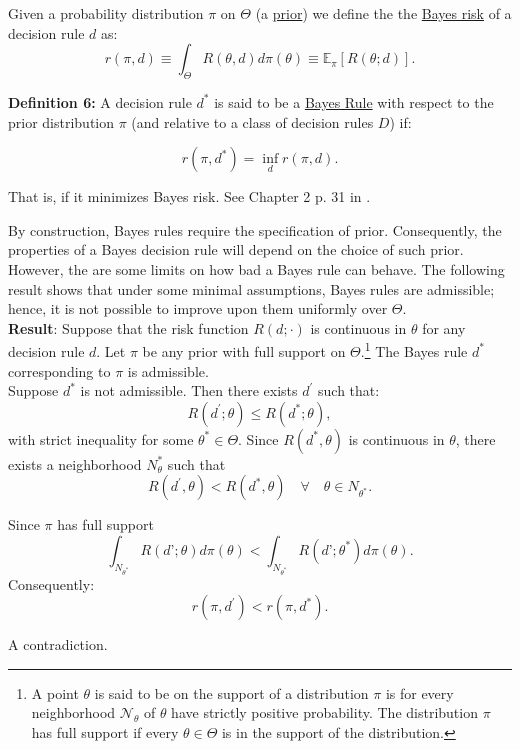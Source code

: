 \documentclass[11pt]{article} %
\begin{document}
Given a probability distribution $\pi$ on $\Theta$ (a \underline{prior}) we define the the \underline{Bayes risk} of a decision rule $d$ as:
\[ r(\pi, d) \equiv \int_{\Theta} R(\theta, d) d \pi (\theta) \equiv \mathbb{E}_{\pi} [ R(\theta; d) ]. \]

\noindent \textbf{Definition 6:} A decision rule $d^*$ is said to be a \underline{Bayes Rule} with respect to the prior distribution $\pi$ (and relative to a class of decision rules $D$) if:

\[ r(\pi, d^*) = \inf_{d} r(\pi, d). \]

\noindent That is, if it minimizes Bayes risk. See Chapter 2 p. 31 in \cite{Ferguson67}.

By construction, Bayes rules require the specification of prior. Consequently, the properties of a Bayes decision rule will depend on the choice of such prior. However, the are some limits on how bad a Bayes rule can behave. The following result shows that under some minimal assumptions, Bayes rules are admissible; hence, it is not possible to improve upon them uniformly over $\Theta$. \\


\noindent \textbf{Result}: Suppose that the risk function $R(d; \cdot)$ is continuous in $\theta$ for any decision rule $d$. Let $\pi$ be any prior with full support on $\Theta$.\footnote{A point $\theta$ is said to be on the support of a distribution $\pi$ is for every neighborhood $\mathcal{N}_{\theta}$ of $\theta$ have strictly positive probability. The distribution $\pi$ has full support if every $\theta \in \Theta$ is in the support of the distribution.} The Bayes rule $d^*$ corresponding to $\pi$ is admissible. \\

 Suppose $d^*$ is not admissible. Then there exists $d^{\prime}$ such that:
\[ R(d^{\prime}; \theta) \leq R(d^*; \theta),  \]
with strict inequality for some $\theta^* \in \Theta$. Since $R(d^*,\theta)$ is continuous in $\theta$, there exists a neighborhood $N_\theta^*$ such that 
\[  R(d^{\prime}, \theta) < R(d^*, \theta) \quad \forall \quad \theta \in N_{\theta^*}. \]

\noindent Since $\pi$ has full support 
\[ \int_{N_{\theta^*}} R(d’;\theta) d \pi(\theta) < \int_{N_{\theta^*}} R(d’;\theta^*) d \pi(\theta).   \]
Consequently:
\[ r(\pi, d^{\prime}) < r(\pi, d^*).   \]

\noindent A contradiction. \\
\end{document}
